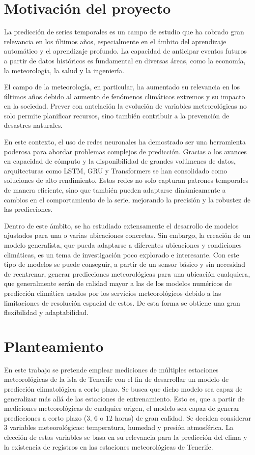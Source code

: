 \section{Motivación del proyecto}
La predicción de series temporales es un campo de estudio que ha cobrado gran relevancia en los últimos años, especialmente en el ámbito del aprendizaje automático y el aprendizaje profundo. 
La capacidad de anticipar eventos futuros a partir de datos históricos es fundamental en diversas áreas, como la economía, la meteorología, la salud y la ingeniería. 

El campo de la meteorología, en particular, ha aumentado su relevancia en los últimos años debido al aumento de fenómenos climáticos extremos y su impacto en la sociedad. 
Prever con antelación la evolución de variables meteorológicas no solo permite planificar recursos, sino también contribuir a la prevención de desastres naturales.

En este contexto, el uso de redes neuronales ha demostrado ser una herramienta poderosa para abordar problemas complejos de predicción.
Gracias a los avances en capacidad de cómputo y la disponibilidad de grandes volúmenes de datos, arquitecturas como LSTM, GRU y Transformers se han consolidado como soluciones de alto rendimiento. 
Estas redes no solo capturan patrones temporales de manera eficiente, sino que también pueden adaptarse dinámicamente a cambios en el comportamiento de la serie, mejorando la precisión y la robustez de las predicciones.

Dentro de este ámbito, se ha estudiado extensamente el desarrollo de modelos ajustados para una o varias ubicaciones concretas. Sin embargo, la creación de un modelo generalista,
que pueda adaptarse a diferentes ubicaciones y condiciones climáticas, es un tema de investigación poco explorado e interesante. Con este tipo de modelos se puede 
conseguir, a partir de un sensor básico y sin necesidad de reentrenar, generar predicciones meteorológicas para una ubicación cualquiera, que generalmente serán de calidad mayor a las de los modelos numéricos de predicción 
climática usados por los servicios meteorológicos debido a las limitaciones de resolución espacial de estos. De esta forma se obtiene una gran flexibilidad y adaptabilidad.

\section{Planteamiento}
En este trabajo se pretende emplear mediciones de múltiples estaciones meteorológicas de la isla de Tenerife con el fin de desarrollar un modelo de predicción climatológica a corto plazo.
Se busca que dicho modelo sea capaz de generalizar más allá de las estaciones de entrenamiento. Esto es, que a partir de mediciones meteorológicas de cualquier origen, el modelo sea capaz de 
generar predicciones a corto plazo (3, 6 o 12 horas) de gran calidad.
Se deciden considerar 3 variables meteorológicas: temperatura, humedad y presión atmosférica.
La elección de estas variables se basa en su relevancia para la predicción del clima y la existencia de registros en las estaciones meteorológicas de Tenerife.

